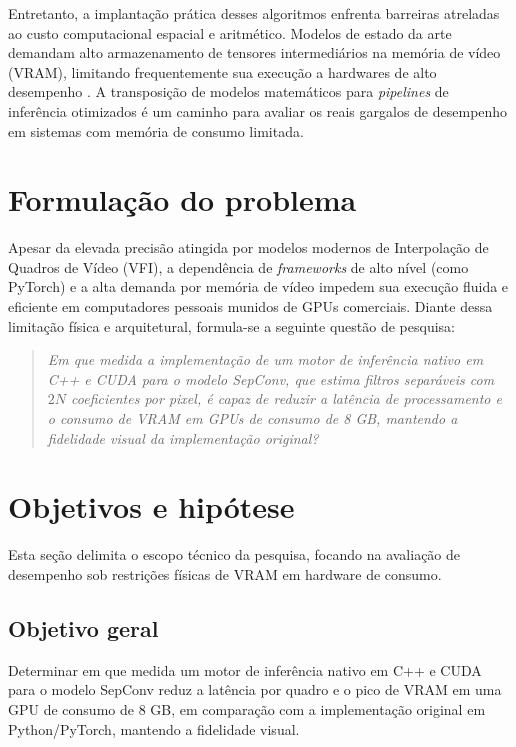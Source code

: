 \documentclass[
    12pt,                %
    openright,           %
    oneside,             %
    a4paper,             %
    english,             %
    brazil               %
]{abntex2}
\begin{document}
Entretanto, a implantação prática desses algoritmos enfrenta barreiras atreladas ao custo computacional espacial e aritmético. Modelos de estado da arte demandam alto armazenamento de tensores intermediários na memória de vídeo (VRAM), limitando frequentemente sua execução a hardwares de alto desempenho \cite{Bao2019}. A transposição de modelos matemáticos para \textit{pipelines} de inferência otimizados é um caminho para avaliar os reais gargalos de desempenho em sistemas com memória de consumo limitada.

\section{Formulação do problema}
\label{sec:problema}

Apesar da elevada precisão atingida por modelos modernos de Interpolação de Quadros de Vídeo (VFI), a dependência de \textit{frameworks} de alto nível (como PyTorch) e a alta demanda por memória de vídeo impedem sua execução fluida e eficiente em computadores pessoais munidos de GPUs comerciais. Diante dessa limitação física e arquitetural, formula-se a seguinte questão de pesquisa:

\begin{quote}
\textit{Em que medida a implementação de um motor de inferência nativo em C++ e CUDA para o modelo SepConv, que estima filtros separáveis com $2N$ coeficientes por pixel, é capaz de reduzir a latência de processamento e o consumo de VRAM em GPUs de consumo de 8 GB, mantendo a fidelidade visual da implementação original?}
\end{quote}

\section{Objetivos e hipótese}
\label{sec:objetivos}

Esta seção delimita o escopo técnico da pesquisa, focando na avaliação de desempenho sob restrições físicas de VRAM em hardware de consumo.

\subsection{Objetivo geral}

Determinar em que medida um motor de inferência nativo em C++ e CUDA para o modelo SepConv reduz a latência por quadro e o pico de VRAM em uma GPU de consumo de 8 GB, em comparação com a implementação original em Python/PyTorch, mantendo a fidelidade visual.
\end{document}
